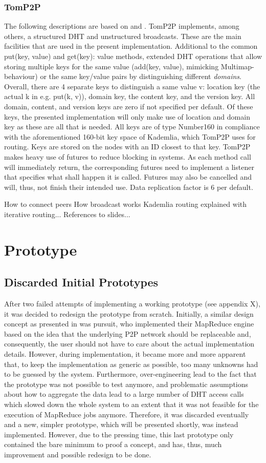 \subsubsection{TomP2P}
The following descriptions are based on \cite{BocekDHT} and \cite{TomP2P}. TomP2P implements, among others, a structured DHT and unstructured broadcasts. These are the main facilities that are used in the present implementation. Additional to the common put(key, value) and get(key): value methods, extended DHT operations that allow storing multiple keys for the same value (add(key, {value}), mimicking Multimap-behaviour) or the same key/value pairs by distinguishing different \textit{domains}. Overall, there are 4 separate keys to distinguish a same value v: location key (the actual k in e.g. put(k, v)), domain key, the content key, and the version key. All domain, content, and version keys are zero if not specified per default. Of these keys, the presented implementation will only make use of location and domain key as these are all that is needed. All keys are of type Number160 in compliance with the aforementioned 160-bit key space of Kademlia, which TomP2P uses for routing. Keys are stored on the nodes with an ID closest to that key. TomP2P makes heavy use of futures to reduce blocking in systems. As each method call will immediately return, the corresponding futures need to implement a listener that specifies what shall happen it is called. Futures may also be cancelled and will, thus, not finish their intended use. Data replication factor is 6 per default.

How to connect peers
How broadcast works
Kademlia routing explained with iterative routing...
References to slides...
\section{Prototype}
\subsection{Discarded Initial Prototypes}
After two failed attempts of implementing a working prototype (see appendix X), it was decided to redesign the prototype from scratch. Initially, a similar design concept as presented in \cite{Steffenel2015} was pursuit, who implemented their MapReduce engine based on the idea that the underlying P2P network should be replaceable and, consequently, the user should not have to care about the actual implementation details. However, during implementation, it became more and more apparent that, to keep the implementation as generic as possible, too many unknowns had to be guessed by the system. Furthermore, over-engineering lead to the fact that the prototype was not possible to test anymore, and problematic assumptions about how to aggregate the data lead to a large number of DHT access calls which slowed down the whole system to an extent that it was not feasible for the execution of MapReduce jobs anymore. Therefore, it was discarded eventually and a new, simpler prototype, which will be presented shortly, was instead implemented. However, due to the pressing time, this last prototype only contained the bare minimum to proof a concept, and has, thus, much improvement and possible redesign to be done. 

